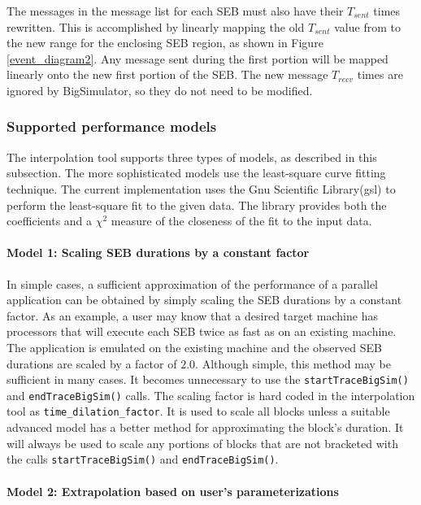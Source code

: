 The messages in the message list for each SEB must also have their $T_{sent}$ times rewritten. This is accomplished by linearly mapping the old $T_{sent}$ value from to the new range for the enclosing SEB region, as shown in Figure \ref{event_diagram2}. Any message sent during the first portion will be mapped linearly onto the new first portion of the SEB. The new message $T_{recv}$ times are ignored by BigSimulator, so they do not need to be modified.


\subsubsection{Supported performance models}
The interpolation tool supports three types of models, as described in this subsection.
The more sophisticated models use the least-square curve fitting technique. 
The current implementation uses the Gnu Scientific Library(gsl) to perform the
least-square fit to the given data. The library provides both the coefficients and a $\chi^2$ measure of the closeness of the fit to the input data. 


\paragraph{Model 1: Scaling SEB durations by a constant factor}

In simple cases, a sufficient approximation of the performance of a parallel application can be obtained
by simply scaling the SEB durations by a constant factor.
As an example, a user may know that a desired target machine has processors that will execute
each SEB twice as fast as on an existing machine.
The application is emulated on the existing machine and the observed SEB durations are scaled
by a factor of $2.0$. Although simple, this method may be sufficient in many cases. It becomes
unnecessary to use the \texttt{startTraceBigSim()} and  \texttt{endTraceBigSim()} calls.
The scaling factor is hard coded in the interpolation tool as \texttt{time\_dilation\_factor}.
It is used to scale all blocks unless a suitable advanced model has a better method for approximating the 
block's duration. It will always be used to scale any portions of blocks that are not bracketed with
the calls \texttt{startTraceBigSim()} and  \texttt{endTraceBigSim()}.

\paragraph{Model 2: Extrapolation based on user's parameterizations}

